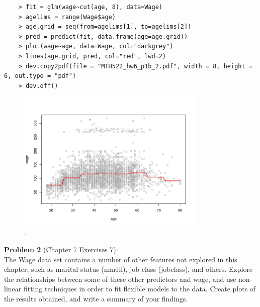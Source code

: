 \documentclass{article}
\begin{document}
\begin{program}
	\begin{verbatim}
	> fit = glm(wage~cut(age, 8), data=Wage)
	> agelims = range(Wage$age)
	> age.grid = seq(from=agelims[1], to=agelims[2])
	> pred = predict(fit, data.frame(age=age.grid))
	> plot(wage~age, data=Wage, col="darkgrey")
	> lines(age.grid, pred, col="red", lwd=2)
	> dev.copy2pdf(file = "MTH522_hw6_p1b_2.pdf", width = 8, height = 6, out.type = "pdf")
	> dev.off()
	\end{verbatim}
\end{program}

\begin{figure}[htb]
	\begin{center}
		\includegraphics[width=0.8\textwidth]{MTH522_hw6_p1b_2.pdf}
	\end{center}
	\caption{.}
	\label{fig:MTH522_hw6_p1b_2}
\end{figure}


\newpage


{\bf Problem 2} (Chapter 7 Exercises 7):\\
The Wage data set contains a number of other features not explored in this chapter, such as marital status (maritl), job class (jobclass), and others. Explore the relationships between some of these other predictors and wage, and use non-linear fitting techniques in order to fit flexible models to the data. Create plots of the results obtained, and write a summary of your findings.\\
\end{document}

